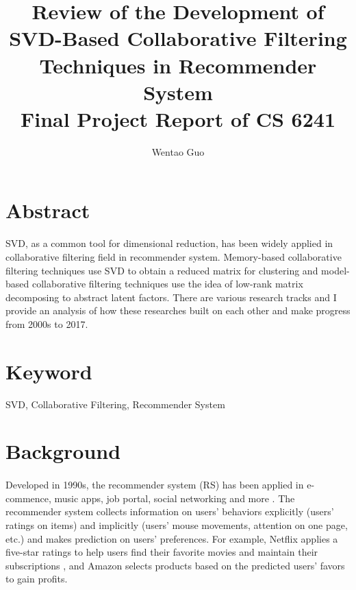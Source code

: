 \documentclass[letter paper, 11pt]{article}
\begin{document}
	
	
	\title{%
		Review of the Development of SVD-Based Collaborative Filtering Techniques in Recommender System \\
		\large Final Project Report of CS 6241}
	
	\author{Wentao Guo}
	
	\date{}
	
	\maketitle
	
	
	\section*{Abstract}		
	SVD, as a common tool for dimensional reduction, has been widely applied in collaborative filtering field in recommender system. Memory-based collaborative filtering techniques use SVD to obtain a reduced matrix for clustering and model-based collaborative filtering techniques use the idea of low-rank matrix decomposing to abstract latent factors. There are various research tracks and I provide an analysis of how these researches built on each other and make progress from 2000s to 2017.
	
	
	\section*{Keyword}
	\begin{center}
	SVD, Collaborative Filtering, Recommender System
	\end{center}

	
	\section{Background} 
	\paragraph{}
	Developed in 1990s, the recommender system (RS) has been applied in e-commence, music apps, job portal, social networking and more \cite{netflix}. The recommender system collects information on users' behaviors explicitly (users' ratings on items) and implicitly (users' mouse movements, attention on one page, etc.) and makes prediction on users' preferences. For example, Netflix applies a five-star ratings to help users find their favorite movies and maintain their subscriptions \cite{gower}, and Amazon selects products based on the predicted users' favors to gain profits. 
	
\end{document}
